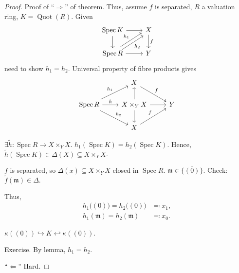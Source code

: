 \documentclass[12pt]{article}
\DeclareMathOperator{\Spec}{Spec}
\DeclareMathOperator{\Quot}{Quot}
\theoremstyle{definition}
\theoremstyle{remark}
\begin{document}
\begin{proof}
Proof of ``$\Rightarrow$'' of theorem. Thus, assume $f$ is separated, $R$ a valuation ring, $K=\Quot(R)$. Given
\[
\begin{tikzcd}
\Spec K\arrow[r]\arrow[d]&X\arrow[d,"f"]\\
\Spec R\arrow[r]\arrow[ru,shift left,"h_1"]\arrow[ru,shift right,"h_2",swap]&Y
\end{tikzcd}
\]
need to show $h_1=h_2$. Universal property of fibre products gives
\[
\begin{tikzcd}
&X\arrow[rd,"f"]\\
\Spec R\arrow[ru,"h_1"]\arrow[r,"\tilde{h}"]\arrow[rd,"h_2"]&X\times_YX\arrow[r]\arrow[u]\arrow[d]&Y\\
&X\arrow[ru,"f"]
\end{tikzcd}
\]

$\exists\tilde{h}:\Spec R\rightarrow X\times_YX$. $h_1(\Spec K)=h_2(\Spec K)$. Hence, $\tilde{h}(\Spec K)\in\Delta(X)\subseteq X\times_YX$.

$f$ is separated, so $\Delta(x)\subseteq X\times_YX$ closed in $\Spec R$. $\mathfrak{m}\in\overline{\{(0)\}}$. Check: $\tilde{f}(\mathfrak{m})\in\Delta$.

Thus,
\begin{align*}
h_1\big((0)\big)=h_2\big((0)\big)&\eqqcolon x_1,\\
h_1(\mathfrak{m})=h_2(\mathfrak{m})&\eqqcolon x_0.
\end{align*}

$\kappa((0))\hookrightarrow K\hookleftarrow\kappa((0))$.

Exercise. By lemma, $h_1=h_2$.

``$\Leftarrow$'' Hard.
\end{proof}
\end{document}
